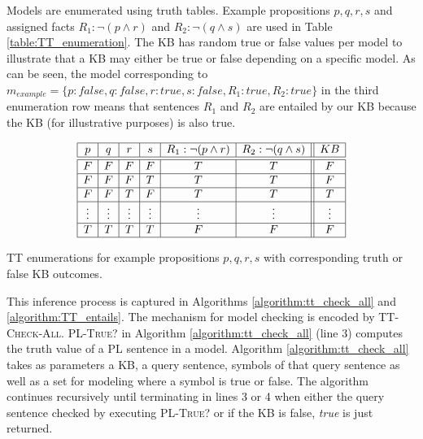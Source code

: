 Models are enumerated using truth tables. Example propositions $p,q,r,s$ and assigned facts $R_1 : \neg (p \wedge r)$ and $R_2  : \neg (q \wedge s)$ are used in Table \ref{table:TT_enumeration}. The KB has random true or false values per model to illustrate that a KB may either be true or false depending on a specific model. As can be seen, the model corresponding to $m_{example}=\{p:false,q:false,r:true,s:false,R_1:true,R_2:true\}$ in the third enumeration row means that sentences $R_1$ and $R_2$ are entailed by our KB because the KB (for illustrative purposes) is also true.

\vspace{-0.4cm}

\begin{table}[H]
	\begin{center}
		\begin{displaymath}  %
			  \begin{array}{|c|c|c|c|c|c||c|}\hline
			    p & q & r & s & R_1 : \neg (p \wedge r) & R_2  : \neg (q \wedge s) & KB \\\hline\hline
			    F & F & F & F & T & T & F\\\hline
			    F & F & F & T & T & T & F\\\hline
			    F & F & T & F & T & T & T\\\hline
			    \vdots & \vdots & \vdots & \vdots & \vdots & \vdots & \vdots\\\hline
			    T & T & T & T & F & F & F\\\hline
			  \end{array}
		  \end{displaymath}
	\end{center}	
	
	\caption{TT enumerations for example propositions $p,q,r,s$ with corresponding truth or false KB outcomes.}
\label{table:TT_enumeration}
\end{table}


\vspace{-0.6cm}
This inference process is captured in Algorithms \ref{algorithm:tt_check_all} and \ref{algorithm:TT_entails}. The mechanism for model checking is encoded by \textsc{TT-Check-All}. \textsc{PL-True?} in Algorithm \ref{algorithm:tt_check_all} (line 3) computes the truth value of a PL sentence in a model. Algorithm \ref{algorithm:tt_check_all} takes as parameters a KB, a query sentence, symbols of that query sentence as well as a set for modeling where a symbol is true or false. The algorithm continues recursively until terminating in lines 3 or 4 when either the query sentence checked by executing \textsc{PL-True?} or if the KB is false, \textit{true} is just returned.

